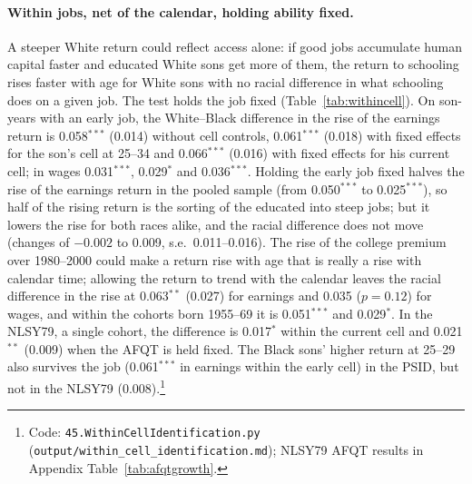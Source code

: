 \paragraph{Within jobs, net of the calendar, holding ability fixed.} A steeper White return could reflect access alone:
if good jobs accumulate human capital faster and educated White sons get more of them, the return to schooling rises
faster with age for White sons with no racial difference in what schooling does on a given job. The test holds the job
fixed (Table~\ref{tab:withincell}). On son-years with an early job, the White--Black difference in the rise of the
earnings return is 0.058$^{***}$ (0.014) without cell controls, 0.061$^{***}$ (0.018) with fixed effects for the son's
cell at 25--34 and 0.066$^{***}$ (0.016) with fixed effects for his current cell; in wages 0.031$^{***}$, 0.029$^{*}$ and
0.036$^{***}$. Holding the early job fixed halves the rise of the earnings return in the pooled sample (from 0.050$^{***}$ to
0.025$^{***}$), so half of the rising return is the sorting of the educated into steep jobs; but it lowers the rise for
both races alike, and the racial difference does not move (changes of $-0.002$ to 0.009, s.e.\ 0.011--0.016).
The rise of the college premium over 1980--2000 could make a return rise with age that is really a rise with calendar
time; allowing the return to trend with the calendar leaves the racial difference in the rise at 0.063$^{**}$ (0.027)
for earnings and 0.035 ($p=0.12$) for wages, and within the cohorts born 1955--69 it is 0.051$^{***}$ and 0.029$^{*}$. In
the NLSY79, a single cohort, the difference is 0.017$^{*}$ within the current cell and 0.021$^{**}$ (0.009) when the AFQT
is held fixed. The Black sons' higher return at 25--29 also survives the job (0.061$^{***}$ in earnings within the early
cell) in the PSID, but not in the NLSY79 (0.008).\footnote{Code: \texttt{45.WithinCellIdentification.py}
(\texttt{output/within\_cell\_identification.md}); NLSY79 AFQT results in Appendix Table~\ref{tab:afqtgrowth}.}

